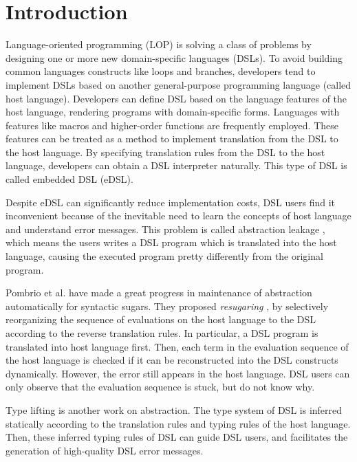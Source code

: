 \section{Introduction}

Language-oriented programming (LOP) \cite{LOP} is solving a class of problems by designing one or more new domain-specific languages (DSLs).
To avoid building common languages constructs like loops and branches,
developers tend to implement DSLs based on another general-purpose programming language (called host language).
Developers can define DSL based on the language features of the host language, rendering programs with domain-specific forms.
Languages with features like macros and higher-order functions are frequently employed\cite{macro-dsl,macro-dsl-2}.
These features can be treated as a method to implement translation from the DSL to the host language.
By specifying translation rules from the DSL to the host language, developers can obtain a DSL interpreter naturally.
This type of DSL is called embedded DSL (eDSL).

Despite eDSL can significantly reduce implementation costs, DSL users find it inconvenient because of the inevitable need to learn the concepts of host language and understand error messages.
This problem is called abstraction leakage \cite{Abstraction},
 which means the users writes a DSL program which is translated into the host language,
 causing the executed program pretty differently from the original program.


Pombrio et al. have made a great progress in maintenance of abstraction automatically for syntactic sugars.
They proposed \textit{resugaring} \cite{resugar}, by selectively reorganizing the sequence of evaluations on the host language to the DSL according to the reverse translation rules.
In particular, a DSL program is translated into host language first.
Then, each term in the evaluation sequence of the host language is checked if it can be reconstructed into the DSL constructs dynamically.
However, the error still appears in the host language.
DSL users can only observe that the evaluation sequence is stuck, but do not know why. 

Type lifting \cite{infer-types} is another work on abstraction.
The type system of DSL is inferred statically according to the translation rules and typing rules of the host language.
Then, these inferred typing rules of DSL can guide DSL users,
 and facilitates the generation of high-quality DSL error messages.

